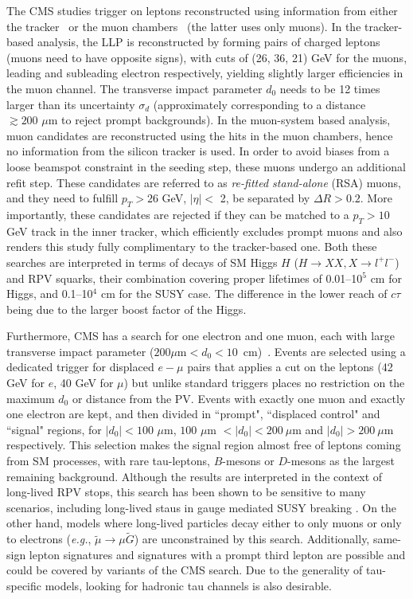 The CMS studies trigger on leptons reconstructed using information from either the tracker~\cite{CMS:2014hka} or the muon chambers~\cite{CMS:2015pca} (the latter uses only muons).  
In the tracker-based analysis, the LLP is reconstructed by forming pairs of charged leptons (muons need to have opposite signs), with \pT cuts of (26, 36, 21) GeV for the muons, leading and subleading electron respectively, yielding slightly larger efficiencies in the muon channel. The transverse impact parameter $d_0$ needs to be 12 times larger than its uncertainty $\sigma_d$ (approximately corresponding to a distance $\gtrsim200\,\,\mu\mathrm{m}$ to reject prompt backgrounds).  In the muon-system based analysis, muon candidates are reconstructed using the hits in the muon chambers, hence no information from the silicon tracker is used. In order to avoid biases from a loose beamspot constraint in the seeding step, these muons undergo an additional refit step. These candidates are referred to as \emph{re-fitted stand-alone} (RSA) muons, and they need to fulfill $p_T > 26$ GeV,  $|\eta| <$ 2, be separated by $\Delta R > 0.2$. More importantly, these candidates are rejected if they can be matched to a $p_T > 10 $ GeV track in the inner tracker, which efficiently excludes prompt muons and also renders this study fully complimentary to the tracker-based one. Both these searches are interpreted in terms of decays of SM Higgs $H$  ($H \to XX, X \to l^+ l^-$) and RPV squarks, their combination covering proper lifetimes of 0.01--10$^5$ cm for Higgs, and 0.1--10$^4$ cm for the SUSY case. The difference in the lower reach of $c \tau$ being due to the larger boost factor of the Higgs.

Furthermore, CMS has a search for one electron and one muon, each with large transverse impact parameter ($200 \mu \mathrm{m} < d_{0} <  10$~cm)~\cite{CMS-PAS-EXO-16-022}. Events are selected using a dedicated trigger for displaced $e-\mu$ pairs that  applies a \pT cut on the leptons (42 GeV for $e$, 40 GeV for $\mu$) but unlike standard triggers places no restriction on the maximum $d_{0}$ or distance from the PV. Events with exactly one muon and exactly one electron are kept, and then divided in ``prompt", ``displaced control" and ``signal" regions, for $|d_0| < 100\,\, \mu$m, $100\,\, \mu $m $ < |d_0| < 200~\mu $m and $|d_0| > 200~\mu $m respectively. This selection makes the signal region almost free of leptons coming from SM processes, with rare tau-leptons, $B$-mesons or $D$-mesons as the largest remaining background. Although the results are interpreted in the context of long-lived RPV stops, this search has been shown to be sensitive to many scenarios, including long-lived staus in gauge mediated SUSY breaking \cite{Evans:2016zau}.   On the other hand, models where long-lived particles decay either to only muons or only to electrons (\emph{e.g.}, $\tilde \mu \to \mu \tilde G$) are unconstrained by this search.  Additionally, same-sign lepton signatures and signatures with a prompt third lepton are possible \cite{Evans:2016zau} and could be covered by variants of the CMS search.  Due to the generality of tau-specific models, looking for hadronic tau channels is also desirable.


